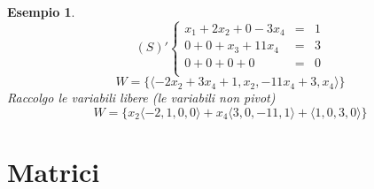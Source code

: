 \documentclass[12pt,a4paper]{article}
\theoremstyle{break}
\newtheorem{example}{Esempio}[subsection]
\begin{document}
    \begin{example}
        \[(S)'
        \left\{
            \begin{array}{lcr}
                x_1 + 2x_2 + 0 - 3x_4 & = & 1 \\
                0 + 0 + x_3 + 11x_4 & = & 3 \\
                0 + 0 + 0 + 0 & = & 0 \\
            \end{array}
        \right.
        \]
        \[W = \{\langle -2x_2+3x_4+1,x_2,-11x_4+3,x_4 \rangle\}\]
        Raccolgo le variabili libere (le variabili non pivot)
        \[W = \{ x_2\langle -2,1,0,0\rangle + x_4\langle 3,0,-11,1\rangle + \langle 1,0,3,0\rangle \}\]    
    \end{example}
    \newpage
    \section{Matrici}
\end{document}
